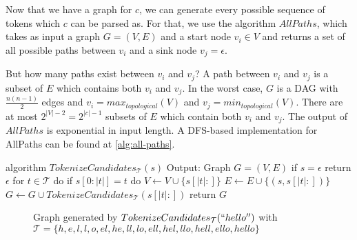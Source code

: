 Now that we have a graph for $c$, we can generate every possible sequence of tokens which $c$ can be parsed as.
For that, we use the algorithm $AllPaths$, which takes as input a graph $G = (V, E)$ and a start node $v_i \in V$ and returns a set of all possible paths between $v_i$ and a sink node $v_j = \epsilon$.

But how many paths exist between $v_i$ and $v_j$? A path between $v_i$ and $v_j$ is a subset of $E$ which contains both $v_i$ and $v_j$.
In the worst case, $G$ is a DAG with $\frac{n(n-1)}{2}$ edges and $v_i = max_{topological}(V)$ and $v_j = min_{topological}(V)$.
There are at most $2^{|V|-2} = 2^{|c|-1}$ subsets of $E$ which contain both $v_i$ and $v_j$.
The output of $AllPaths$ is exponential in input length.
A DFS-based implementation for AllPaths can be found at \autoref{alg:all-paths}.

\begin{Pseudocode}[float,caption={TokenizeCandidates algorithm},label={alg:tokenize-candidates}]
	algorithm $TokenizeCandidates_{\mathcal{T}}(s)$
		Output: Graph $G = (V, E)$
		if $s = \epsilon$
			return $\epsilon$
		for $t \in \mathcal{T}$ do
			if $s[0{:}|t|] = t$ do
				$V \leftarrow V \cup \{ s[|t|{:}] \}$
				$E \leftarrow E \cup \{ (s, s[|t|{:}]) \}$
				$G \leftarrow G \cup TokenizeCandidates_{\mathcal{T}}(s[|t|{:}])$
		return $G$
\end{Pseudocode}

\begin{figure}[htbp]
	\centering
	\caption{Graph generated by $TokenizeCandidates_{\mathcal{T}}(``hello'')$ with $\mathcal{T} = \{ h, e, l, l, o, el, he, ll, lo, ell, hel, llo, hell, ello, hello \}$}
	\label{fig:ex-graph-tokenize-candidates}
\end{figure}

